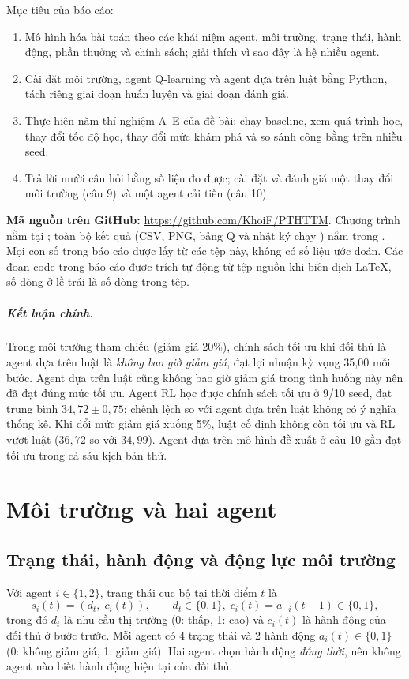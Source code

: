 \documentclass[12pt,a4paper]{report}
\begin{document}
Mục tiêu của báo cáo:
\begin{enumerate}
\item Mô hình hóa bài toán theo các khái niệm agent, môi trường, trạng thái, hành
  động, phần thưởng và chính sách; giải thích vì sao đây là hệ nhiều agent.
\item Cài đặt môi trường, agent Q-learning và agent dựa trên luật bằng Python, tách
  riêng giai đoạn huấn luyện và giai đoạn đánh giá.
\item Thực hiện năm thí nghiệm A--E của đề bài: chạy baseline, xem quá trình học,
  thay đổi tốc độ học, thay đổi mức khám phá và so sánh công bằng trên nhiều seed.
\item Trả lời mười câu hỏi bằng số liệu đo được; cài đặt và đánh giá một thay đổi
  môi trường (câu 9) và một agent cải tiến (câu 10).
\end{enumerate}

\noindent\textbf{Mã nguồn trên GitHub:} \url{https://github.com/KhoiF/PTHTTM}.
Chương trình nằm tại ; toàn bộ kết quả
(CSV, PNG, bảng Q và nhật ký chạy ) nằm trong
. Mọi con số trong báo cáo được lấy từ các tệp
này, không có số liệu ước đoán. Các đoạn code trong báo cáo được trích tự động từ
tệp nguồn khi biên dịch LaTeX, số dòng ở lề trái là số dòng trong tệp.

\paragraph{Kết luận chính.} Trong môi trường tham chiếu (giảm giá 20\%), chính sách
tối ưu khi đối thủ là agent dựa trên luật là \emph{không bao giờ giảm giá}, đạt
lợi nhuận kỳ vọng 35{,}00 mỗi bước. Agent dựa trên luật cũng không bao giờ giảm giá
trong tình huống này nên đã đạt đúng mức tối ưu. Agent RL học được chính sách
tối ưu ở 9/10 seed, đạt trung bình $34{,}72\pm0{,}75$; chênh lệch so với agent dựa
trên luật không có ý nghĩa thống kê. Khi đổi mức giảm giá xuống 5\%, luật cố định
không còn tối ưu và RL vượt luật ($36{,}72$ so với $34{,}99$). Agent dựa trên mô hình
đề xuất ở câu 10 gần đạt tối ưu trong cả sáu kịch bản thử.

\chapter{Môi trường và hai agent}
\label{chap:model}

\section{Trạng thái, hành động và động lực môi trường}
Với agent $i\in\{1,2\}$, trạng thái cục bộ tại thời điểm $t$ là
\begin{equation}
s_i(t)=(d_t,\;c_i(t)),\qquad d_t\in\{0,1\},\; c_i(t)=a_{-i}(t-1)\in\{0,1\},
\end{equation}
trong đó $d_t$ là nhu cầu thị trường (0: thấp, 1: cao) và $c_i(t)$ là hành động
của đối thủ ở bước trước. Mỗi agent có 4 trạng thái và 2 hành động
$a_i(t)\in\{0,1\}$ (0: không giảm giá, 1: giảm giá). Hai agent chọn hành động
\emph{đồng thời}, nên không agent nào biết hành động hiện tại của đối thủ.
\end{document}
